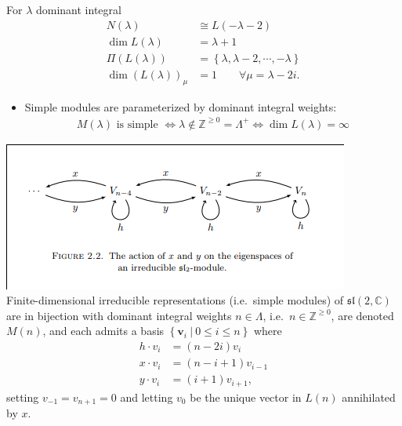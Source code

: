\documentclass[11pt]{scrartcl}
\theoremstyle{definition}
\theoremstyle{theorem}
\theoremstyle{proof}
\theoremstyle{definition}
\theoremstyle{break}
\theoremstyle{problem}
\providecommand{\tightlist}{%
  \setlength{\itemsep}{0pt}\setlength{\parskip}{0pt}}
\DeclarePairedDelimiter\qty{(}{)}
\renewcommand{\qty}[1]{{\left(  {#1} \right)}}
\newcommand{\CC}[0]{{\mathbb{C}}}
\newcommand{\ZZ}[0]{{\mathbb{Z}}}
\newcommand{\liesl}[0]{{\mathfrak{sl}}}
\newcommand{\suchthat}[0]{{~\mathrel{\Big|}~}}
\newcommand{\theset}[1]{\left\{{#1}\right\}}
\renewcommand{\vector}[1]{\mathbf{#1}}
\begin{document}
For \(\lambda\) dominant integral \begin{align*}
N(\lambda) &\cong L(-\lambda - 2) \\
\dim L(\lambda) &= \lambda + 1 \\
\Pi(L(\lambda)) &= \theset{\lambda, \lambda-2, \cdots, -\lambda} \\
\dim \qty{L(\lambda)}_\mu &= 1 \quad\quad\forall \mu = \lambda-2i 
.\end{align*}

\begin{itemize}
\tightlist
\item
  Simple modules are parameterized by dominant integral weights:
  \begin{align*}M(\lambda) \text{ is simple } \iff \lambda \not\in\ZZ^{\geq 0} = \Lambda^+ \iff \dim L(\lambda) = \infty\end{align*}
\end{itemize}

\includegraphics{figures/2020-03-16-13:59.png}\\

Finite-dimensional irreducible representations (i.e.~simple modules) of
\(\liesl(2, \CC)\) are in bijection with dominant integral weights
\(n\in \Lambda\), i.e.~\(n\in \ZZ^{\geq 0}\), are denoted \(M(n)\), and
each admits a basis \(\theset{\vector v_i\suchthat 0\leq i \leq n}\)
where \begin{align*}
h \cdot v_{i} &= (n-2 i) v_{i}\\
x \cdot v_{i} &= (n-i+1) v_{i-1}\\
y \cdot v_{i} &= (i+1)v_{i+1}
,\end{align*} setting \(v_{-1} = v_{n + 1}=0\) and letting \(v_0\) be
the unique vector in \(L(n)\) annihilated by \(x\).
\end{document}
